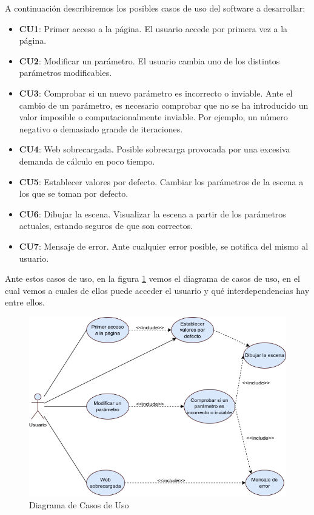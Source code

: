A continuación describiremos los posibles casos de uso del software a desarrollar:
\begin{itemize}
    \item \textbf{CU1}: Primer acceso a la página. El usuario accede por primera vez a la página.
    \item \textbf{CU2}: Modificar un parámetro. El usuario cambia uno de los distintos parámetros modificables.
    \item \textbf{CU3}: Comprobar si un nuevo parámetro es incorrecto o inviable. Ante el cambio de un parámetro, es necesario comprobar que no se ha introducido un valor imposible o computacionalmente inviable. Por ejemplo, un número negativo o demasiado grande de iteraciones.
    \item \textbf{CU4}: Web sobrecargada. Posible sobrecarga provocada por una excesiva demanda de cálculo en poco tiempo.
    \item \textbf{CU5}: Establecer valores por defecto. Cambiar los parámetros de la escena a los que se toman por defecto.
    \item \textbf{CU6}: Dibujar la escena. Visualizar la escena a partir de los parámetros actuales, estando seguros de que son correctos.
    \item \textbf{CU7}: Mensaje de error. Ante cualquier error posible, se notifica del mismo al usuario.
\end{itemize}

Ante estos casos de uso, en la figura \ref{fig:casos-uso} vemos el diagrama de casos de uso, en el cual vemos a cuales de ellos puede acceder el usuario y qué interdependencias hay entre ellos.

\begin{figure} [ht]
\centering
\includegraphics[scale = 0.4]{img/diagrama-CU.png}
\caption{Diagrama de Casos de Uso}
    \label{fig:casos-uso}
\end{figure}
\newpage

